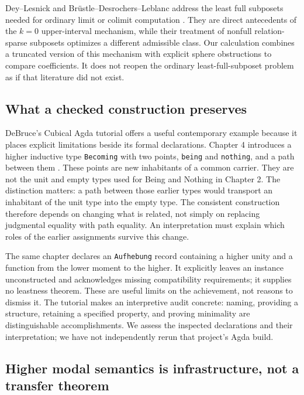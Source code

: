 Dey--Lesnick and Br\"ustle--Desrochers--Leblanc address the least
full subposets needed for ordinary limit or colimit computation
\cite{DeyLesnick,BrustleEtAl}. They are direct antecedents of the
$k=0$ upper-interval mechanism, while their treatment of nonfull
relation-sparse subposets optimizes a different admissible class. Our
calculation combines a truncated version of this mechanism with explicit
sphere obstructions to compare coefficients. It does not reopen the
ordinary least-full-subposet problem as if that literature did not exist.

\subsection{What a checked construction preserves}

DeBruce's Cubical Agda tutorial offers a useful contemporary example
because it places explicit limitations beside its formal declarations.
Chapter 4 introduces a higher inductive type \texttt{Becoming} with two
points, \texttt{being} and \texttt{nothing}, and a path between them
\cite{DeBruce}. These points are new inhabitants of a common carrier.
They are not the unit and empty types used for Being and Nothing in
Chapter 2. The distinction matters: a path between those earlier types
would transport an inhabitant of the unit type into the empty type.
The consistent construction therefore depends on changing what is
related, not simply on replacing judgmental equality with path equality.
An interpretation must explain which roles of the earlier assignments
survive this change.

The same chapter declares an \texttt{Aufhebung} record containing a
higher unity and a function from the lower moment to the higher. It
explicitly leaves an instance unconstructed and acknowledges missing
compatibility requirements; it supplies no leastness theorem. These are
useful limits on the achievement, not reasons to dismiss it. The tutorial
makes an interpretive audit concrete: naming, providing a structure,
retaining a specified property, and proving minimality are distinguishable
accomplishments. We assess the inspected declarations and their
interpretation; we have not independently rerun that project's Agda build.

\subsection{Higher modal semantics is infrastructure, not a transfer theorem}

